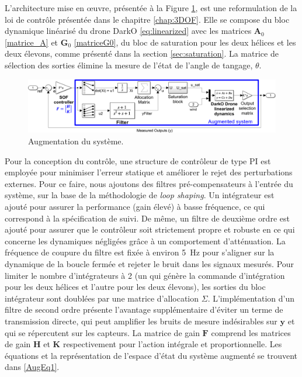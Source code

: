  L'architecture mise en œuvre, présentée à la Figure \ref{Plant Augmentation}, est une reformulation de la loi de contrôle présentée dans le chapitre \ref{chap:3DOF}. Elle se compose du bloc dynamique linéarisé du drone DarkO \eqref{eq:linearized} avec les matrices $\boldsymbol{A}_{0}$ \eqref{matrice_A} et $\boldsymbol{G}_{0}$ \eqref{matriceG0}, du bloc de saturation pour les deux hélices et les deux élevons, comme présenté dans la section \ref{sec:saturation}. La matrice de sélection des sorties élimine la mesure de l'état de l'angle de tangage, $\theta$.

\begin{figure}[hbt]
    \centering
    \includegraphics[width=0.9\columnwidth]{figures/AugWindFinal.png}
    \vspace{-0.3cm}\caption{Augmentation du système.}
    \label{Plant Augmentation}
\end{figure}


Pour la conception du contrôle, une structure de contrôleur de type PI est employée pour minimiser l'erreur statique et améliorer le rejet des perturbations externes. Pour ce faire, nous ajoutons des filtres pré-compensateurs à l'entrée du système, sur la base de la méthodologie de \textit{loop shaping}. Un intégrateur est ajouté pour assurer la performance (gain élevé) à basse fréquence, ce qui correspond à la spécification de suivi. De même, un filtre de deuxième ordre est ajouté pour assurer que le contrôleur soit strictement propre et robuste en ce qui concerne les dynamiques négligées grâce à un comportement d'atténuation. La fréquence de coupure du filtre est fixée à environ \SI{5}{\hertz} pour s'aligner sur la dynamique de la boucle fermée et rejeter le bruit dans les signaux mesurés. Pour limiter le nombre d'intégrateurs à 2 (un qui génère la commande d'intégration pour les deux hélices et l'autre pour les deux élevons), les sorties du bloc intégrateur sont doublées par une matrice d'allocation $\Sigma$. L'implémentation d'un filtre de second ordre présente l'avantage supplémentaire d'éviter un terme de transmission directe, qui peut amplifier les bruits de mesure indésirables sur $\boldsymbol{y}$ et qui se répercutent sur les capteurs. La matrice de gain $\boldsymbol{F}$ comprend les matrices de gain $\boldsymbol{H}$ et $\boldsymbol{K}$ respectivement pour l'action intégrale et proportionnelle. Les équations et la représentation de l'espace d'état du système augmenté se trouvent dans \eqref{AugEq1}.

